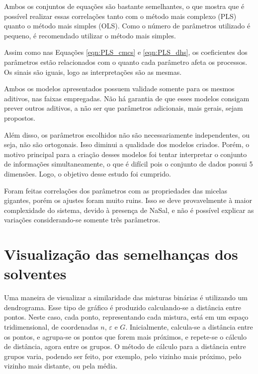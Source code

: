 		Ambos os conjuntos de equações são bastante semelhantes, o que mostra que é possível realizar essas correlações tanto com o método mais complexo (PLS) quanto o método mais simples (OLS). Como o número de parâmetros utilizado é pequeno, é recomendado utilizar o método mais simples. %
		
		Assim como nas Equações \ref{eqn:PLS_cmcs} e \ref{eqn:PLS_dhs}, os coeficientes dos parâmetros estão relacionados com o quanto cada parâmetro afeta os processos. Os sinais são iguais, logo as interpretações são as mesmas.
		
		Ambos os modelos apresentados possuem validade somente para os mesmos aditivos, nas faixas empregadas. Não há garantia de que esses modelos consigam prever outros aditivos, a não ser que parâmetros adicionais, mais gerais, sejam propostos.
		
		Além disso, os parâmetros escolhidos não são necessariamente independentes, ou seja, não são ortogonais. Isso diminui a qualidade dos modelos criados. Porém, o motivo principal para a criação desses modelos foi tentar interpretar o conjunto de informações simultaneamente, o que é difícil pois o conjunto de dados possui 5 dimensões. Logo, o objetivo desse estudo foi cumprido.
		
		Foram feitas correlações dos parâmetros com as propriedades das micelas gigantes, porém os ajustes foram muito ruins. Isso se deve provavelmente à maior complexidade do sistema, devido à presença de NaSal, e não é possível explicar as variações considerando-se somente três parâmetros.
		
		
		\FloatBarrier
		
		\section{Visualização das semelhanças dos solventes} 
		
		Uma maneira de visualizar a similaridade das misturas binárias é utilizando um dendrograma. Esse tipo de gráfico é produzido calculando-se a distância entre pontos. Neste caso, cada ponto, representando cada mistura, está em um espaço tridimensional, de coordenadas \(n\), \(\varepsilon\) e \(G\). Inicialmente, calcula-se a distância entre os pontos, e agrupa-se os pontos que forem mais próximos, e repete-se o cálculo de distância, agora entre os grupos. O método de cálculo para a distância entre grupos varia, podendo ser feito, por exemplo, pelo vizinho mais próximo, pelo vizinho mais distante, ou pela média. \cite{MarciaQuimiometria}
		
